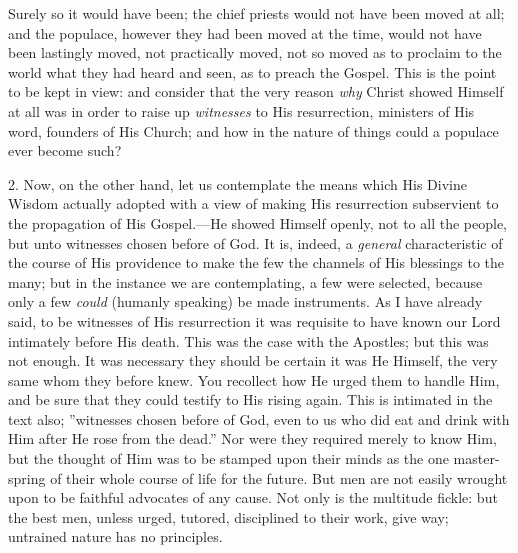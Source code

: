 Surely so it would have been; the chief priests would
not have been moved at all; and the populace, however
they had been moved at the time, would not have been
lastingly moved, not practically moved, not so moved as
to proclaim to the world what they had heard and seen, as
to preach the Gospel. This is the point to be kept in
view: and consider that the very reason \emph{why} Christ
showed Himself at all was in order to raise up \emph{witnesses}
to His resurrection, ministers of His word, founders of
His Church; and how in the nature of things could a
populace ever become such?

2. Now, on the other hand, let us contemplate the
means which His Divine Wisdom actually adopted with a
view of making His resurrection subservient to the
propagation of His Gospel.—He showed Himself openly,
not to all the people, but unto witnesses chosen before
of God. It is, indeed, a \emph{general} characteristic of
the course of His providence to make the few the channels
of His blessings to the many; but in the instance we are
contemplating, a few were selected, because only a few \emph{could}
(humanly speaking) be made instruments. As I have already
said, to be witnesses of His resurrection it was
requisite to have known our Lord intimately before His
death. This was the case with the Apostles; but this was
not enough. It was necessary they should be certain it
was He Himself, the very same whom they before knew. You
recollect how He urged them to handle Him, and be sure
that they could testify to His rising again. This is
intimated in the text also; ''witnesses chosen before of
God, even to us who did eat and drink with Him after He
rose from the dead.'' Nor were they required merely
to know Him, but the thought of Him was to be stamped
upon their minds as the one master-spring of their whole
course of life for the future. But men are not easily
wrought upon to be faithful advocates of any cause. Not
only is the multitude fickle: but the best men, unless
urged, tutored, disciplined to their work, give way;
untrained nature has no principles.

